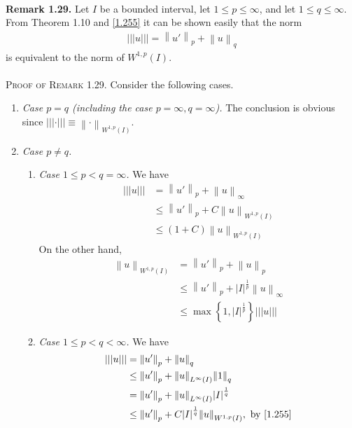 \documentclass[a4paper,oneside]{article}
\numberwithin{equation}{section}
\begin{document}
\\
\textbf{Remark 1.29.} Let $I$ be a bounded interval, let $1\le p\le \infty$, and let $1\le q\le \infty$. From Theorem 1.10 and \eqref{1.255} it can be shown easily that the norm
\begin{align}
|||u||| = {\left\| {u'} \right\|_p} + {\left\| u \right\|_q}
\end{align}
is equivalent to the norm of $W^{1,p}\left(I\right)$.\\
\\
\textsc{Proof of Remark 1.29.} Consider the following cases.
\begin{enumerate}
\item \textit{Case $p=q$ (including the case $p=\infty,q=\infty$).} The conclusion is obvious since $||| \cdot ||| \equiv {\left\|  \cdot  \right\|_{{W^{1,p}}\left( I \right)}}$.
\item \textit{Case $p\ne q$. }
\begin{enumerate}
\item \textit{Case $1 \le p < q = \infty $.} We have
\begin{align}
|||u||| &= {\left\| {u'} \right\|_p} + {\left\| u \right\|_\infty }\\
& \le {\left\| {u'} \right\|_p} + C{\left\| u \right\|_{{W^{1,p}}\left( I \right)}}\\
& \le \left( {1 + C} \right){\left\| u \right\|_{{W^{1,p}}\left( I \right)}}
\end{align}
On the other hand,
\begin{align}
{\left\| u \right\|_{{W^{1,p}}\left( I \right)}} &= {\left\| {u'} \right\|_p} + {\left\| u \right\|_p}\\
& \le {\left\| {u'} \right\|_p} + {\left| I \right|^{\frac{1}{p}}}{\left\| u \right\|_\infty }\\
& \le \max \left\{ {1,{{\left| I \right|}^{\frac{1}{p}}}} \right\}|||u|||
\end{align}
\item \textit{Case $1 \le p < q < \infty$.} We have
\begin{align}
|||u||| &= {\left\| {u'} \right\|_p} + {\left\| u \right\|_q}\\
& \le {\left\| {u'} \right\|_p} + {\left\| u \right\|_{{L^\infty }\left( I \right)}}{\left\| 1 \right\|_q}\\
& = {\left\| {u'} \right\|_p} + {\left\| u \right\|_{{L^\infty }\left( I \right)}}{\left| I \right|^{\frac{1}{q}}}\\
& \le {\left\| {u'} \right\|_p} + C{\left| I \right|^{\frac{1}{q}}}{\left\| u \right\|_{{W^{1,p}}\left( I \right)}},\mbox{ by \eqref{1.255}}\\

\end{align}
\end{enumerate}
\end{enumerate}
\end{document}
